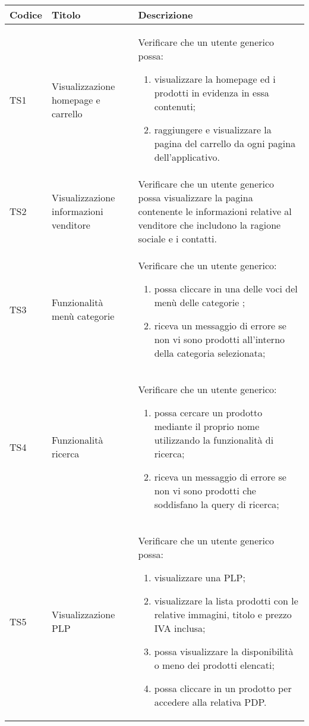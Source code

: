 \begin{center}
	\begin{longtable}{p{1cm}|p{6.85cm}|p{7cm}|}
	\hline
	\rowcolor{lighter-grayer}
	\textbf{Codice} & \textbf{Titolo} & \textbf{Descrizione} \\
	\hline
	\endfirsthead



	\hline
	TS1 & Visualizzazione homepage e carrello & Verificare che un utente generico possa: \begin{enumerate}
		\item  visualizzare la homepage ed i prodotti in evidenza in essa contenuti;
		\item  raggiungere e visualizzare la pagina del carrello da ogni pagina dell'applicativo.
	\end{enumerate} \\

	TS2 & Visualizzazione informazioni venditore & Verificare che un utente generico possa visualizzare la pagina contenente le informazioni relative al venditore che includono la ragione sociale e i contatti. \\

	TS3 & Funzionalità menù categorie & Verificare che un utente generico: \begin{enumerate}
		\item  possa cliccare in una delle voci del menù delle categorie ;
		\item  riceva un messaggio di errore se non vi sono prodotti all'interno della categoria selezionata;
	\end{enumerate} \\

	TS4 & Funzionalità ricerca & Verificare che un utente generico: \begin{enumerate}
		\item  possa cercare un prodotto mediante il proprio nome utilizzando la funzionalità di ricerca;
		\item  riceva un messaggio di errore se non vi sono prodotti che soddisfano la query di ricerca;
	\end{enumerate} \\


	TS5 & Visualizzazione PLP & Verificare che un utente generico possa: \begin{enumerate}
		\item  visualizzare una PLP;
		\item  visualizzare la lista prodotti con le relative immagini, titolo e prezzo IVA inclusa;
		\item  possa visualizzare la disponibilità o meno dei prodotti elencati;
		\item  possa cliccare in un prodotto per accedere alla relativa PDP.
	\end{enumerate} \\


\end{longtable}
\end{center}
